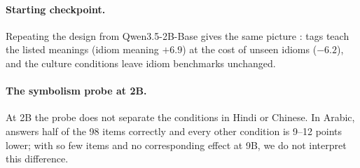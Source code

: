 \paragraph{Starting checkpoint.}
Repeating the design from Qwen3.5-2B-Base gives the same picture : tags teach the listed meanings (idiom meaning $+6.9$) at the cost of unseen idioms ($-6.2$), and the culture conditions leave idiom benchmarks unchanged.

\paragraph{The symbolism probe at 2B.}
At 2B the probe does not separate the conditions in Hindi or Chinese. In Arabic, \random{} answers half of the 98 items correctly and every other condition is 9--12 points lower; with so few items and no corresponding effect at 9B, we do not interpret this difference.
